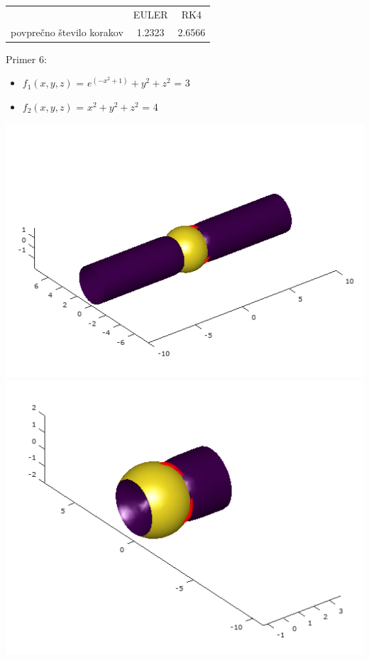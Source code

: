 \documentclass[]{article}
\begin{document}
	\begin{center}
	\begin{tabular}{ |c|c|c| } 
 		\hline
 			 & EULER & RK4 \\ 
			povprečno število korakov & 1.2323 & 2.6566 \\ 
 		\hline
 	\end{tabular}
	\end{center}
	Primer 6:
	\begin{itemize}  
		\item $f_{1}(x,y,z)$ = $e^{(-x^{2}+1)}+y^{2}+z^{2}$ = 3
		\item $f_{2}(x,y,z)$ = $x^2 + y^2 + z^2$ = 4
	\end{itemize}
	\includegraphics[scale=0.3]{primer6_1}
	\includegraphics[scale=0.3]{primer6_2}\\
\end{document}
